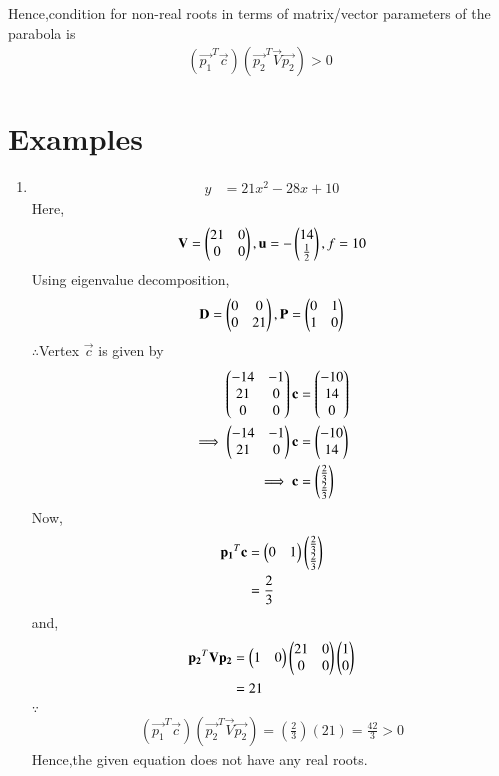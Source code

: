 \documentclass[journal,12pt,twocolumn]{IEEEtran}
\begin{document}
Hence,condition for non-real roots in terms of matrix/vector parameters of the parabola is 
\begin{align}
    \boxed{(\vec{p_1}^T\vec{c})(\vec{p_2}^T\vec{V}\vec{p_2}) > 0}
\end{align}

\section{Examples}
\begin{enumerate}
    \item 
    \begin{align}
        y &= 21x^2-28x+10
    \end{align}
    Here,
    \begin{align}
        \mathbf{V} = \begin{pmatrix}21 & 0 \\ 0 & 0\end{pmatrix},\mathbf{u}=-\begin{pmatrix}14 \\ \frac{1}{2}\end{pmatrix},f=10
    \end{align}
    Using eigenvalue decomposition,
    \begin{align}
        \mathbf{D} = \begin{pmatrix}0 & 0\\0 & 21\end{pmatrix} ,\mathbf{P}=\begin{pmatrix}0 & 1\\1 & 0\end{pmatrix}
    \end{align}
    $\therefore$Vertex $\vec{c}$ is given by
    \begin{align}
        \begin{pmatrix}-14 & -1 \\ 21 & 0 \\ 0 & 0\end{pmatrix}\mathbf{c} &= \begin{pmatrix}-10 \\ 14 \\ 0\end{pmatrix} \\
        \implies  \begin{pmatrix}-14 & -1 \\ 21 & 0\end{pmatrix}\mathbf{c} &= \begin{pmatrix}-10 \\ 14\end{pmatrix}
        \\
        \implies \mathbf{c} &= \begin{pmatrix}\frac{2}{3} \\ \frac{2}{3}\end{pmatrix}
    \end{align}
    Now,
    \begin{align}
        \mathbf{p_1}^T\mathbf{c} &= \begin{pmatrix}0 & 1\end{pmatrix}\begin{pmatrix}\frac{2}{3} \\ \frac{2}{3}\end{pmatrix}
        \\
        &= \frac{2}{3}
    \end{align}
    and,
    \begin{align}
        \mathbf{p_2}^T\mathbf{V}\mathbf{p_2} &= \begin{pmatrix}1 & 0\end{pmatrix}\begin{pmatrix}21 & 0\\0& 0\end{pmatrix}\begin{pmatrix}1 \\ 0\end{pmatrix}
        \\
        &= 21
    \end{align}
    $\because$
    \begin{align}
    (\vec{p_1}^T\vec{c})(\vec{p_2}^T\vec{V}\vec{p_2}) = (\frac{2}{3})(21) = \frac{42}{3}>0
    \end{align}
    Hence,the given equation does not have any real roots.
    

\end{enumerate}
\end{document}
